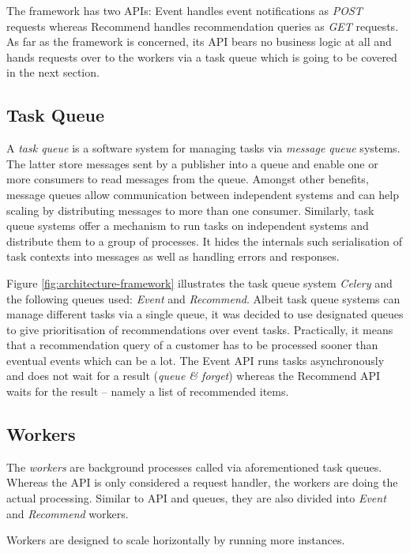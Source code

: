 The framework has two APIs: Event handles event notifications as \emph{POST} requests whereas Recommend handles recommendation queries as \emph{GET} requests. As far as the framework is concerned, its API bears no business logic at all and hands requests over to the workers via a task queue which is going to be covered in the next section.

\subsection{Task Queue}

A \emph{task queue} is a software system for managing tasks via \emph{message queue} systems. The latter store messages sent by a publisher into a queue and enable one or more consumers to read messages from the queue. Amongst other benefits, message queues allow communication between independent systems and can help scaling by distributing messages to more than one consumer. Similarly, task queue systems offer a mechanism to run tasks on independent systems and distribute them to a group of processes. It hides the internals such serialisation of task contexts into messages as well as handling errors and responses.

Figure \ref{fig:architecture-framework} illustrates the task queue system \emph{Celery} and the following queues used: \emph{Event} and \emph{Recommend}. Albeit task queue systems can manage different tasks via a single queue, it was decided to use designated queues to give prioritisation of recommendations over event tasks. Practically, it means that a recommendation query of a customer has to be processed sooner than eventual events which can be a lot. The Event API runs tasks asynchronously and does not wait for a result (\emph{queue \& forget}) whereas the Recommend API waits for the result -- namely a list of recommended items.

\subsection{Workers}

The \emph{workers} are background processes called via aforementioned task queues. Whereas the API is only considered a request handler, the workers are doing the actual processing. Similar to API and queues, they are also divided into \emph{Event} and \emph{Recommend} workers.

Workers are designed to scale horizontally by running more instances.
